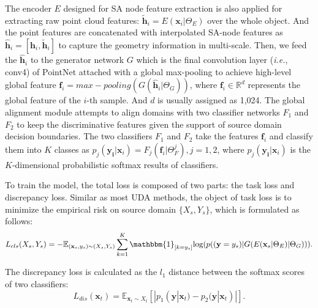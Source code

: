 \documentclass{article}
\newcommand*\ie{\textit{i.e.}}
\begin{document}
The encoder $E$ designed for SA node feature extraction is also applied for extracting raw point cloud features: ${\tilde{\mathbf{h}}_i}=E\left ( \mathbf{x}_i|{\Theta}_E \right )$ over the whole object. And the point features are concatenated with interpolated SA-node features as $\mathbf{\hat{h}}_i = [{\mathbf{h}}_i, \tilde{\mathbf{h}}_i]$ to capture the geometry information in multi-scale. Then, we feed the $\mathbf{\hat{h}}_i$ to the generator network $G$ which is the final convolution layer (\ie, conv4) of PointNet attached with a global max-pooling to achieve high-level global feature  ${{\mathbf{f}_i}= max-pooling(G ( \mathbf{\hat{h}}_{i}|{\Theta}_G ))} $, where $\mathbf{f}_i \in \mathbb{R}^{d}$ represents the global feature of the $i$-th sample. And $d$ is usually assigned as 1,024. The global alignment module attempts to align domains with two classifier networks $F_{1}$ and $F_{2}$ to keep the discriminative features given the support of source domain decision boundaries. The two classifiers $F_1$ and $F_2$ take the features $\mathbf{f}_i$ and classify them into $K$ classes as $p_j(\mathbf{y_i}|\mathbf{x}_i)= F_j\left ( \mathbf{f}_i|{\Theta}_F^j \right), j=1, 2$, where ${p_j(\mathbf{y_i}|\mathbf{x}_i)}$ is the $K$-dimensional probabilistic softmax results of classifiers.












To train the model, the total loss is composed of two parts: the task loss and discrepancy loss. Similar as most UDA methods, the object of task loss is to minimize the empirical risk on source domain ${\{X_s,Y_s\}}$, which is formulated as follows:
\begin{equation}
{L}_{cls}({X}_{s},Y_{s})=- \mathbb{E}_{(\mathbf{x}_s,y_s)  \sim (X_s,Y_s)} \sum_{k=1}^{K}  \mathbbm{1}_{[k=y_s]}{\mathrm{\log}{(p((\mathbf{y}=y_s) | G(E(\mathbf{x}_{s}|\Theta_E)|{\Theta}_G))})}.  \label{e9}    
\end{equation}



The discrepancy loss is calculated as the $l_1$ distance between the softmax scores of two classifiers:
\begin{equation}
{L}_{dis}(\mathbf{x}_{t})=  \mathbb{E}_{\mathbf{x}_t  \sim X_t} [|p_1(\mathbf{y}|\mathbf{x}_t) - p_2(\mathbf{y}|\mathbf{x}_t)|]. \label{e10}
\end{equation}
\end{document}
